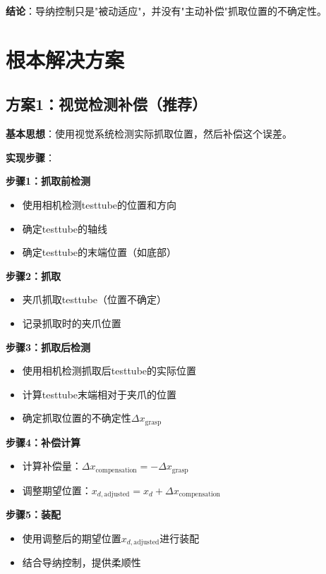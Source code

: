 \documentclass[12pt,a4paper]{article}
\begin{document}
\textbf{结论}：导纳控制只是"被动适应"，并没有"主动补偿"抓取位置的不确定性。

\section{根本解决方案}

\subsection{方案1：视觉检测补偿（推荐）}

\textbf{基本思想}：使用视觉系统检测实际抓取位置，然后补偿这个误差。

\textbf{实现步骤}：

\textbf{步骤1：抓取前检测}
\begin{itemize}
\item 使用相机检测testtube的位置和方向
\item 确定testtube的轴线
\item 确定testtube的末端位置（如底部）
\end{itemize}

\textbf{步骤2：抓取}
\begin{itemize}
\item 夹爪抓取testtube（位置不确定）
\item 记录抓取时的夹爪位置
\end{itemize}

\textbf{步骤3：抓取后检测}
\begin{itemize}
\item 使用相机检测抓取后testtube的实际位置
\item 计算testtube末端相对于夹爪的位置
\item 确定抓取位置的不确定性$\Delta x_{\text{grasp}}$
\end{itemize}

\textbf{步骤4：补偿计算}
\begin{itemize}
\item 计算补偿量：$\Delta x_{\text{compensation}} = -\Delta x_{\text{grasp}}$
\item 调整期望位置：$x_{d,\text{adjusted}} = x_d + \Delta x_{\text{compensation}}$
\end{itemize}

\textbf{步骤5：装配}
\begin{itemize}
\item 使用调整后的期望位置$x_{d,\text{adjusted}}$进行装配
\item 结合导纳控制，提供柔顺性
\end{itemize}
\end{document}
